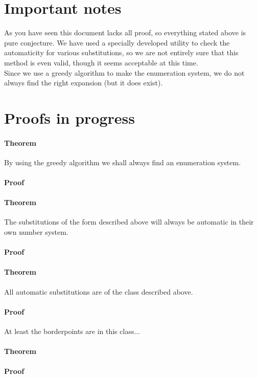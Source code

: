 \documentclass{article}
\begin{document}
\section{Important notes}
As you have seen this document lacks all proof, so everything stated above
is pure conjecture. We have used a specially developed utility to check the
automaticity for various substitutions, so we are not entirely sure that
this method is even valid, though it seems acceptable at this time.\\
Since we use a greedy algorithm to make the enumeration system, we do not 
always find the right expansion (but it does exist).

\section{Proofs in progress}
\paragraph{Theorem} By using the greedy algorithm we shall always find an
enumeration system.
\paragraph{Proof}
\paragraph{Theorem} The substitutions of the form described above will 
always be automatic in their own number system.
\paragraph{Proof}
\paragraph{Theorem} All automatic substitutions are of the class described
above.
\paragraph{Proof} At least the borderpoints are in this class...
\paragraph{Theorem}
\paragraph{Proof}
\end{document}
